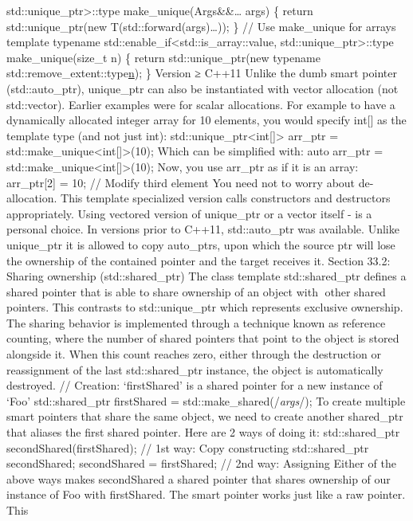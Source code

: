 std::unique\_ptr\textgreater::type make\_unique(Args\&\&\ldots{} args)
\{ return std::unique\_ptr(new T(std::forward(args)\ldots)); \} // Use
make\_unique for arrays template typename
std::enable\_if\textless std::is\_array::value,
std::unique\_ptr\textgreater::type make\_unique(size\_t n) \{ return
std::unique\_ptr(new typename std::remove\_extent::type\href{}{n}); \}
Version ≥ C++11 Unlike the dumb smart pointer (std::auto\_ptr),
unique\_ptr can also be instantiated with vector allocation (not
std::vector). Earlier examples were for scalar allocations. For example
to have a dynamically allocated integer array for 10 elements, you would
specify int{[}{]} as the template type (and not just int):
std::unique\_ptr\textless int{[}{]}\textgreater{} arr\_ptr =
std::make\_unique\textless int{[}{]}\textgreater(10); Which can be
simpliﬁed with: auto arr\_ptr =
std::make\_unique\textless int{[}{]}\textgreater(10); Now, you use
arr\_ptr as if it is an array: arr\_ptr{[}2{]} = 10; // Modify third
element You need not to worry about de-allocation. This template
specialized version calls constructors and destructors appropriately.
Using vectored version of unique\_ptr or a vector itself - is a personal
choice. In versions prior to C++11, std::auto\_ptr was available. Unlike
unique\_ptr it is allowed to copy auto\_ptrs, upon which the source ptr
will lose the ownership of the contained pointer and the target receives
it. Section 33.2: Sharing ownership (std::shared\_ptr) The class
template std::shared\_ptr deﬁnes a shared pointer that is able to share
ownership of an object with other shared pointers. This contrasts to
std::unique\_ptr which represents exclusive ownership. The sharing
behavior is implemented through a technique known as reference counting,
where the number of shared pointers that point to the object is stored
alongside it. When this count reaches zero, either through the
destruction or reassignment of the last std::shared\_ptr instance, the
object is automatically destroyed. // Creation: `firstShared' is a
shared pointer for a new instance of `Foo' std::shared\_ptr firstShared
= std::make\_shared(/\emph{args}/); To create multiple smart pointers
that share the same object, we need to create another shared\_ptr that
aliases the ﬁrst shared pointer. Here are 2 ways of doing it:
std::shared\_ptr secondShared(firstShared); // 1st way: Copy
constructing std::shared\_ptr secondShared; secondShared = firstShared;
// 2nd way: Assigning Either of the above ways makes secondShared a
shared pointer that shares ownership of our instance of Foo with
firstShared. The smart pointer works just like a raw pointer. This
